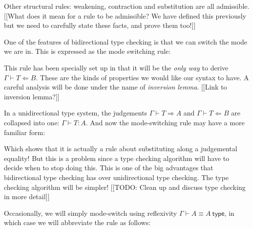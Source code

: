 Other structural rules: weakening, contraction and substitution are all admissible. [[What does it mean for a rule to be admissible? We have defined this previously but we need to carefully state these facts, and prove them too!]]

\begin{defin}
    One of the features of bidirectional type checking is that we can switch the mode we are in. This is expressed as the mode switching rule:

    \begin{prooftree}
    \end{prooftree}
\end{defin}

\begin{remark}
    This rule has been specially set up in that it will be the \emph{only way} to derive $\Gamma \vdash T \Leftarrow B$. These are the kinds of properties we would like our syntax to have. A careful analysis will be done under the name of \emph{inversion lemma}. [[Link to inversion lemma?]]

    In a unidirectional type system, the judgements $\Gamma \vdash T \Rightarrow A$ and $\Gamma \vdash T \Leftarrow B$ are collapsed into one: $\Gamma \vdash T : A$. And now the mode-switching rule may have a more familiar form:

    \begin{prooftree}
    \end{prooftree}

    Which shows that it is actually a rule about substituting along a judgemental equality! But this is a problem since a type checking algorithm will have to decide when to stop doing this. This is one of the big advantages that bidirectional type checking has over unidirectional type checking. The type checking algorithm will be simpler! [[TODO: Clean up and discuss type checking in more detail]]
\end{remark}

\begin{remark}
    Occasionally, we will simply mode-switch using reflexivity $\Gamma \vdash A \equiv A \ \mathsf{type}$, in which case we will abbreviate the rule as follows:
    \begin{prooftree}
    \end{prooftree}
\end{remark}

